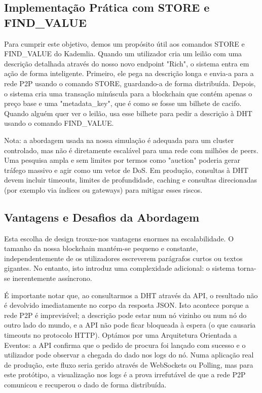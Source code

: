 \documentclass[11pt]{article}
\begin{document}
\subsection{Implementação Prática com STORE e FIND\_VALUE}
Para cumprir este objetivo, demos um propósito útil aos comandos STORE e FIND\_VALUE do Kademlia. Quando um utilizador cria um leilão com uma descrição detalhada através do nosso novo endpoint "Rich", o sistema entra em ação de forma inteligente. Primeiro, ele pega na descrição longa e envia-a para a rede P2P usando o comando STORE, guardando-a de forma distribuída. Depois, o sistema cria uma transação minúscula para a blockchain que contém apenas o preço base e uma "metadata\_key", que é como se fosse um bilhete de cacifo. Quando alguém quer ver o leilão, usa esse bilhete para pedir a descrição à DHT usando o comando FIND\_VALUE.
    
    Nota: a abordagem usada na nossa simulação é adequada para um cluster controlado, mas não é diretamente escalável para uma rede com milhões de peers. Uma pesquisa ampla e sem limites por termos como "auction" poderia gerar tráfego massivo e agir como um vetor de DoS. Em produção, consultas à DHT devem incluir timeouts, limites de profundidade, caching e consultas direcionadas (por exemplo via índices ou gateways) para mitigar esses riscos.

\subsection{Vantagens e Desafios da Abordagem}
Esta escolha de design trouxe-nos vantagens enormes na escalabilidade. O tamanho da nossa blockchain mantém-se pequeno e constante, independentemente de os utilizadores escreverem parágrafos curtos ou textos gigantes. No entanto, isto introduz uma complexidade adicional: o sistema torna-se inerentemente assíncrono. 

É importante notar que, ao consultarmos a DHT através da API, o resultado não é devolvido imediatamente no corpo da resposta JSON. Isto acontece porque a rede P2P é imprevisível; a descrição pode estar num nó vizinho ou num nó do outro lado do mundo, e a API não pode ficar bloqueada à espera (o que causaria timeouts no protocolo HTTP). Optámos por uma Arquitetura Orientada a Eventos: a API confirma que o pedido de procura foi lançado com sucesso e o utilizador pode observar a chegada do dado nos logs do nó. Numa aplicação real de produção, este fluxo seria gerido através de WebSockets ou Polling, mas para este protótipo, a visualização nos logs é a prova irrefutável de que a rede P2P comunicou e recuperou o dado de forma distribuída.
\end{document}
